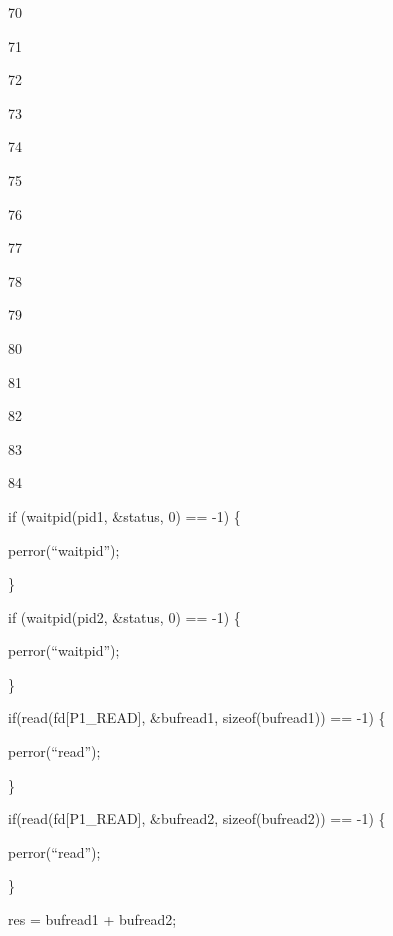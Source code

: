 \documentclass[a4paper,portrait,12pt]{article}
\begin{document}
70


71


72


73


74


75


76


77


78


79


80


81


82


83


84





\begin{flushleft}
if (waitpid(pid1, \&status, 0) == -1) \{
\end{flushleft}


\begin{flushleft}
perror({``}waitpid'');
\end{flushleft}


\}


\begin{flushleft}
if (waitpid(pid2, \&status, 0) == -1) \{
\end{flushleft}


\begin{flushleft}
perror({``}waitpid'');
\end{flushleft}


\}


\begin{flushleft}
if(read(fd[P1\_READ], \&bufread1, sizeof(bufread1)) == -1) \{
\end{flushleft}


\begin{flushleft}
perror({``}read'');
\end{flushleft}


\}


\begin{flushleft}
if(read(fd[P1\_READ], \&bufread2, sizeof(bufread2)) == -1) \{
\end{flushleft}


\begin{flushleft}
perror({``}read'');
\end{flushleft}


\}


\begin{flushleft}
res = bufread1 + bufread2;
\end{flushleft}
\end{document}
